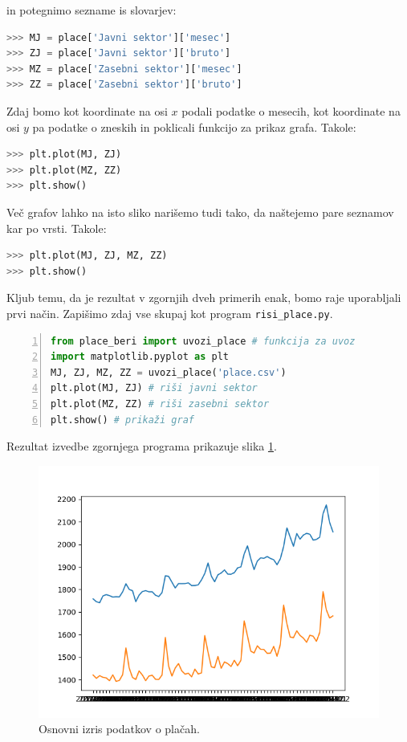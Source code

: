 in potegnimo sezname is slovarjev:
\begin{lstlisting}[language=Python]
>>> MJ = place['Javni sektor']['mesec']
>>> ZJ = place['Javni sektor']['bruto']
>>> MZ = place['Zasebni sektor']['mesec']
>>> ZZ = place['Zasebni sektor']['bruto']
\end{lstlisting}
Zdaj bomo kot koordinate na osi $x$ podali podatke o mesecih, kot koordinate na osi $y$ pa podatke o zneskih in poklicali funkcijo za prikaz grafa. Takole:
\begin{lstlisting}[language=Python, showstringspaces=false]
>>> plt.plot(MJ, ZJ)
>>> plt.plot(MZ, ZZ)
>>> plt.show()
\end{lstlisting}
Več grafov lahko na isto sliko narišemo tudi tako, da naštejemo pare seznamov kar po vrsti. Takole: 
\begin{lstlisting}[language=Python, showstringspaces=false]
>>> plt.plot(MJ, ZJ, MZ, ZZ)
>>> plt.show()
\end{lstlisting}
Kljub temu, da je rezultat v zgornjih dveh primerih enak, bomo raje uporabljali prvi način.
Zapišimo zdaj vse skupaj kot program \texttt{risi\_place.py}.
\begin{lstlisting}[language=Python, showstringspaces=false,numbers=left]
from place_beri import uvozi_place # funkcija za uvoz
import matplotlib.pyplot as plt 
MJ, ZJ, MZ, ZZ = uvozi_place('place.csv')
plt.plot(MJ, ZJ) # riši javni sektor
plt.plot(MZ, ZZ) # riši zasebni sektor
plt.show() # prikaži graf
\end{lstlisting}
Rezultat izvedbe zgornjega programa prikazuje slika \ref{img:plt3}.
\begin{figure}
    \includegraphics[width=\linewidth]{img/plt3.png}
    \caption{Osnovni izris podatkov o plačah.}
    \label{img:plt3}
\end{figure}

